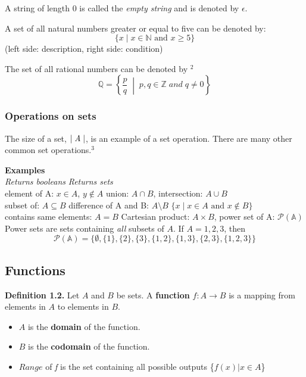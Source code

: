 \documentclass{article}
\begin{document}
A string of length 0 is called the \emph{empty string} and is denoted 
by $\epsilon$.

A set of all natural numbers greater or equal to five can be denoted by:
$$ \{ x \mid x \in \mathbb{N} \text{ and } x \geq 5 \} $$ 
(left side: description, right side: condition)

The set of all rational numbers can be denoted by $^2$
$$ \mathbb{Q} = \left\{ \frac{p}{q} \; \middle\vert \; p, q \in \mathbb{Z} \; and \; q \neq 0 \right\} $$


\subsubsection*{Operations on sets}
The size of a set, $\mid \emph{A} \mid$, is an example of a set operation. There
are many other common set operations.$^3$


\textbf{Examples}\\
\emph{Returns booleans} \hfill \emph{Returns sets}\\
element of A: $x \in A$, $y \not\in A$ \hfill union: $A \cap B$, intersection: $A \cup B$ \\
subset of: $A \subseteq B$ \hfill difference of A and B:  $A \setminus B$ 
$\{ x \mid x \in A \text{ and } x \notin B \}$ \\
contains same elements: $A = B$ \hfill Cartesian product: $A \times B$, power set of A: $\mathcal{P}(\mathbb{A})$ \\ 

Power sets are sets containing \emph{all} subsets of $A$. If $A = {1, 2, 3}$, then
$$\mathcal{P}(\mathbb{A}) = \{\emptyset, \{1\}, \{2\}, \{3\}, \{1, 2\}, 
\{1, 3\}, \{2, 3\}, \{1, 2, 3\}\}$$

\newpage
\subsection{Functions}
\textbf{Definition 1.2.} Let $A$ and $B$ be sets. A \textbf{function} $ f
: A \to B $ is a mapping from elements in $A$ to elements in $B$. 
\begin{itemize}[itemsep=0pt] 
    \renewcommand{\labelitemi}{} %
    \footnotesize %
    \item $A$ is the \textbf{domain} of the function.
    \item $B$ is the \textbf{codomain} of the function.
    \item $Range$ of \emph{f} is the set containing all possible outputs \{$ f(x)| x \in A $\}
\end{itemize}
\end{document}
